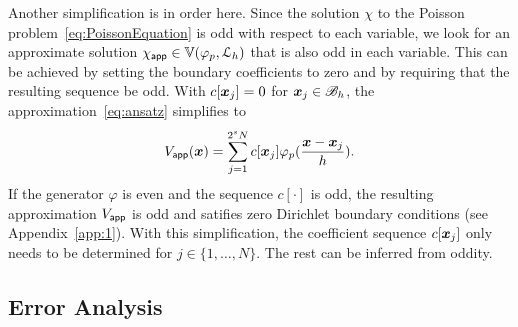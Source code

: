 Another simplification is in order here. 
Since the solution $\chi$ to the Poisson problem~\eqref{eq:PoissonEquation} is odd with respect to each variable, we look for an approximate solution $\appf{\chi} \in \aspace{\lattice{L}_h}{\varphi_p}$ that is also odd in each variable. 
This can be achieved by setting the boundary coefficients to zero and by requiring that the resulting sequence be odd. 
With $c[\vect{x}_j] = 0$ for $\vect{x}_j \in \pointset{B}_h$, the approximation~\eqref{eq:ansatz} simplifies to
\begin{equation}
\appf{V}(\vect{x}) = \sum_{j=1}^{2^sN} c[\vect{x}_j] 
\varphi_p(\frac{\vect{x} - \vect{x}_j}{h}).
\label{eq:simplifiedAnsatz}
\end{equation}
If the generator $\varphi$ is even and the sequence $c[\cdot]$ is odd, the resulting approximation $\appf{V}$ is odd and satifies zero Dirichlet boundary conditions (see Appendix~\ref{app:1}). 
With this simplification, the coefficient sequence $c[\vect{x}_j]$ only needs to be determined for $j \in \{1,\ldots,N\}$. The rest can be inferred from oddity.  

\subsection{Error Analysis}


